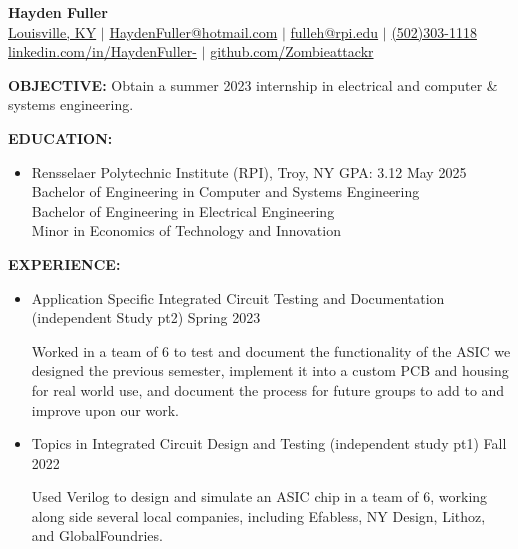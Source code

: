 \documentclass[11pt]{article}
\begin{document}
\begin{center}
\Large{\textbf{Hayden Fuller}} \\
\normalsize{\href{https://www.google.com/maps/place/Louisville,+KY/@38.1889916,-85.8168535,11z/data=!3m1!4b1!4m6!3m5!1s0x88690b1ab35bd511:0xd4d3b4282071fd32!8m2!3d38.2526647!4d-85.7584557!16zL20vMGZfXzE!5m1!1e4}{Louisville, KY} $|$ \href{mailto:HaydenFuller@hotmail.com}{HaydenFuller@hotmail.com} $|$ \href{mailto:fulleh@rpi.edu}{fulleh@rpi.edu} $|$ \href{tel:5023031118}{(502)303-1118} \\
\href{https://www.linkedin.com/in/haydenfuller-/}{linkedin.com/in/HaydenFuller-} $|$ \href{https://github.com/Zombieattackr}{github.com/Zombieattackr}}
\end{center}

\textbf{OBJECTIVE:} Obtain a summer 2023 internship in electrical and computer \& systems engineering.

\vspace{0.2cm}

\textbf{EDUCATION:} 
\begin{itemize}
    \item Rensselaer Polytechnic Institute (RPI), Troy, NY \quad GPA: 3.12 \hfill May 2025 \\
    Bachelor of Engineering in Computer and Systems Engineering \\
    Bachelor of Engineering in Electrical Engineering \\
    Minor in Economics of Technology and Innovation
\end{itemize}

\textbf{EXPERIENCE:}
\begin{itemize}
    \item Application Specific Integrated Circuit Testing and Documentation (independent Study pt2)  \hfill Spring 2023
    \begin{addmargin}[1em]{2em}
        Worked in a team of 6 to test and document the functionality of the ASIC we designed the previous semester, implement it into a custom PCB and housing for real world use, and document the process for future groups to add to and improve upon our work.
    \end{addmargin}
    \item Topics in Integrated Circuit Design and Testing (independent study pt1)  \hfill Fall 2022
    \begin{addmargin}[1em]{2em}
        Used Verilog to design and simulate an ASIC chip in a team of 6, working along side several local companies, including Efabless, NY Design, Lithoz, and GlobalFoundries. 
    \end{addmargin}
\end{itemize}
\end{document}

